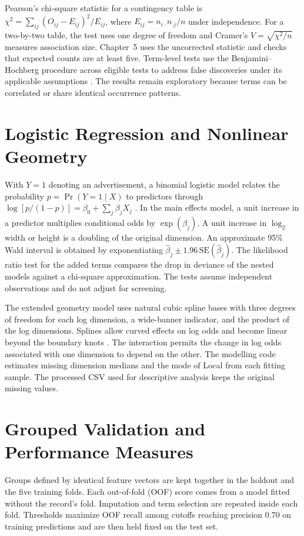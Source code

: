 Pearson's chi-square statistic for a contingency table is
\(\chi^2=\sum_{ij}(O_{ij}-E_{ij})^2/E_{ij}\), where
\(E_{ij}=n_{i\cdot}n_{\cdot j}/n\) under independence. For a two-by-two
table, the test uses one degree of freedom and Cramer's
\(V=\sqrt{\chi^2/n}\) measures association size. Chapter~5 uses the
uncorrected statistic and checks that expected counts are at least five.
Term-level tests use the Benjamini--Hochberg procedure across eligible
tests to address false discoveries under its applicable assumptions
\citep{benjamini1995}. The results remain exploratory because terms can
be correlated or share identical occurrence patterns.

\section{Logistic Regression and Nonlinear Geometry}
With \(Y=1\) denoting an advertisement, a binomial logistic model relates
the probability \(p=\Pr(Y=1\mid X)\) to predictors through
\(\log[p/(1-p)]=\beta_0+\sum_j\beta_jX_j\)
\citep{rGLM}. In the main effects model, a unit increase in a predictor
multiplies conditional odds by \(\exp(\beta_j)\). A unit increase in
\(\log_2\) width or height is a doubling of the original dimension.
An approximate 95\% Wald interval is obtained by exponentiating
\(\hat\beta_j\pm1.96\,\mathrm{SE}(\hat\beta_j)\).
The likelihood ratio test for the added terms compares the drop in
deviance of the nested models against a chi-square approximation.
The tests assume independent observations and do not adjust for screening.

The extended geometry model uses natural cubic spline bases with three
degrees of freedom for each log dimension, a wide-banner indicator, and
the product of the log dimensions. Splines allow curved effects on
log odds and become linear beyond the boundary knots \citep{rSplines}.
The interaction permits the change in log odds associated with one
dimension to depend on the other. The modelling code estimates missing
dimension medians and the mode of Local from each fitting sample.
The processed CSV used for descriptive analysis keeps the original
missing values.

\section{Grouped Validation and Performance Measures}
Groups defined by identical feature vectors are kept together in the
holdout and the five training folds. Each out-of-fold (OOF) score comes
from a model fitted without the record's fold. Imputation and term
selection are repeated inside each fold. Thresholds maximize OOF recall
among cutoffs reaching precision 0.70 on training predictions and are
then held fixed on the test set.

